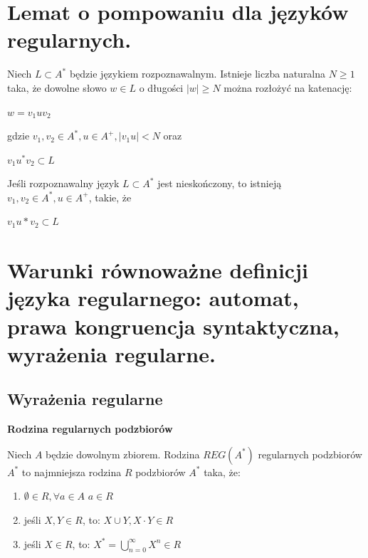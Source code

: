 \documentclass[12pt]{article}
\begin{document}
    \section{Lemat o pompowaniu dla języków regularnych.}
    \begin{definition}
        Niech $L \subset A^*$ będzie językiem rozpoznawalnym. Istnieje liczba naturalna $N \geq 1$ taka, że dowolne słowo $w \in L$ o długości $|w| \geq N$ można rozłożyć na katenację:
        \begin{center}
            $w = v_1uv_2$
        \end{center}
        gdzie $v_1, v_2 \in A^*, u \in A^+, |v_1u| < N$ oraz
        \begin{center}
            $v_1u^*v_2 \subset L$
        \end{center}
    \end{definition}

    \begin{definition}
        Jeśli rozpoznawalny język $L \subset A^*$ jest nieskończony, to istnieją
        $v_1, v_2 \in A^*, u \in A^+$, takie, że
        \begin{center}
            $v_1u*v_2 \subset L$
        \end{center}
    \end{definition}

    \newpage

    \section{Warunki równoważne definicji języka regularnego: automat, prawa kongruencja syntaktyczna, wyrażenia regularne.}
    \subsection{Wyrażenia regularne}

    \begin{definition}
        \textbf{Rodzina regularnych podzbiorów}

        Niech $A$ będzie dowolnym zbiorem. Rodzina $REG(A^*)$ regularnych podzbiorów
        $A^*$ to najmniejsza rodzina $R$ podzbiorów $A^*$ taka, że:

        \begin{enumerate}
            \item $\emptyset \in R, \forall a \in A$ ${a} \in R$
            \item jeśli $X, Y \in R$, to: $X \cup Y, X \cdot Y \in R$
            \item jeśli $X \in R$, to: $X^* = \bigcup\limits_{n = 0}^{\infty} X^n \in R$
        \end{enumerate}
    \end{definition}
\end{document}
